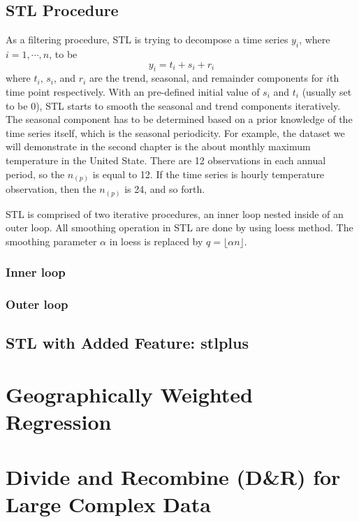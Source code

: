 \subsection{STL Procedure}

As a filtering procedure, STL is trying to decompose a time series 
$y_i$, where $i=1, \cdots, n$, to be
\begin{equation} 
\label{stlModel}
y_i = t_i + s_i + r_i
\end{equation}
where $t_i$, $s_i$, and $r_i$ are the trend, seasonal, and remainder components
for $i$th time point respectively. With an pre-defined initial value of $s_i$ and 
$t_i$ (usually set to be 0), STL starts to smooth the seasonal and trend components iteratively. The 
seasonal component has to be determined based on a prior knowledge of the time
series itself, which is the seasonal periodicity. For example, the dataset we will
demonstrate in the second chapter is the about monthly maximum temperature in the
United State. There are 12 observations in each annual period, so the $n_{(p)}$ 
is equal to 12. If the time series is hourly temperature observation, then the
$n_{(p)}$ is 24, and so forth.

STL is comprised of two iterative procedures, an inner loop nested inside of an
outer loop. All smoothing operation in STL are done by using loess method. The
smoothing parameter $\alpha$ in loess is replaced by $q=\lfloor \alpha n\rfloor$.


\subsubsection{Inner loop}

\subsubsection{Outer loop}

\subsection{STL with Added Feature: stlplus}

\section{Geographically Weighted Regression}

\section{Divide and Recombine (D\&R) for Large Complex Data}

